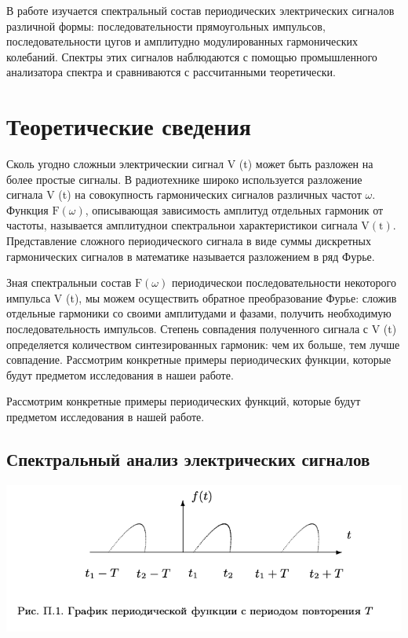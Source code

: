 \documentclass[a4paper, 12pt]{article}%
\begin{document}
В работе изучается спектральный состав периодических электрических сигналов различной формы: последовательности прямоугольных импульсов, последовательности цугов и амплитудно модулированных гармонических колебаний. Спектры этих сигналов наблюдаются с помощью промышленного анализатора спектра и сравниваются с рассчитанными теоретически. 

\section{Теоретические сведения}

Сколь угодно сложныи электрическии сигнал $\mathrm{V}$ (t) может быть разложен на более простые сигналы. В радиотехнике широко используется разложение сигнала V (t) на совокупность гармонических сигналов различных частот $\omega .$ Функция $\mathrm{F}(\omega)$, описывающая зависимость амплитуд отдельных гармоник от частоты, называется амплитуднои спектральнои характеристикои сигнала $\mathrm{V}(\mathrm{t})$. Представление сложного периодического сигнала в виде суммы дискретных гармонических сигналов в математике называется разложением в ряд Фурье.

Зная спектральныи состав $\mathrm{F}(\omega)$ периодическои последовательности некоторого импульса V (t), мы можем осуществить обратное преобразование Фурье: сложив отдельные гармоники со своими амплитудами и фазами, получить необходимую последовательность импульсов. Степень совпадения полученного сигнала с V (t) определяется количеством синтезированных гармоник: чем их больше, тем лучше совпадение.
Рассмотрим конкретные примеры периодических функции, которые будут предметом исследования в нашеи работе.

Рассмотрим конкретные примеры периодических функций, которые будут предметом исследования в нашей работе.

\subsection{Спектральный анализ электрических сигналов}

\begin{center}
\includegraphics[width=0.7\linewidth]{./anat/1.jpg}\\
\end{center}
\end{document}
